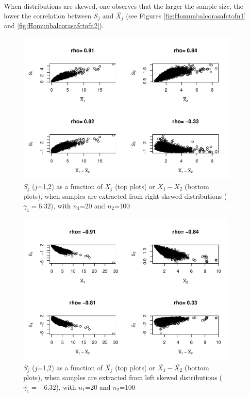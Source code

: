 \documentclass[
  english,
  man,mask,floatsintext]{apa6}
\begin{document}
When distributions are skewed, one observes that the larger the sample size, the lower the correlation between \(S_j\) and \(\bar{X_j}\) (see Figures \ref{fig:Homunbalcorasafctofn1} and \ref{fig:Homunbalcorasafctofn2}).

\begin{figure}
\centering
\includegraphics{Correlation_files/figure-latex/pltSDHomunbalRskew-1.pdf}
\caption{\label{fig:pltSDHomunbalRskew}\(S_j\) (\(j\)=1,2) as a function of \(\bar{X_j}\) (top plots) or \(\bar{X_1}-\bar{X_2}\) (bottom plots), when samples are extracted from right skewed distributions (\(\gamma_1 = 6.32\)), with \(n_1\)=20 and \(n_2\)=100}
\end{figure}

\begin{figure}
\centering
\includegraphics{Correlation_files/figure-latex/pltSDHomunbalLskew-1.pdf}
\caption{\label{fig:pltSDHomunbalLskew}\(S_j\) (\(j\)=1,2) as a function of \(\bar{X_j}\) (top plots) or \(\bar{X_1}-\bar{X_2}\) (bottom plots), when samples are extracted from left skewed distributions (\(\gamma_1 = -6.32\)), with \(n_1\)=20 and \(n_2\)=100}
\end{figure}
\end{document}
